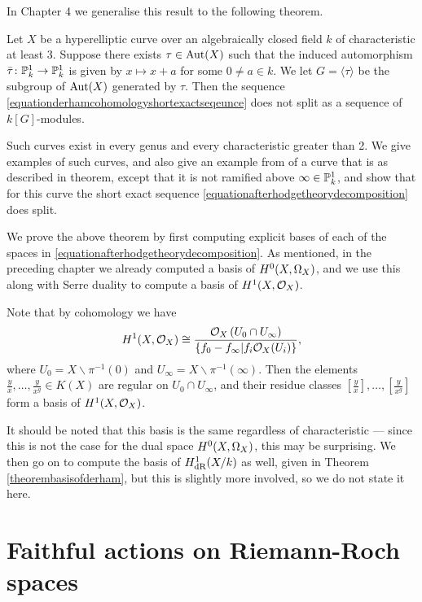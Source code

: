 In Chapter 4 we generalise this result to the following theorem.
    \begin{unnumthm}
    Let $X$ be a hyperelliptic curve over an algebraically closed field $k$ of characteristic at least 3.
    Suppose there exists $\tau \in \operatorname{Aut}(X)$ such that the induced automorphism $\bar \tau \colon \mathbb P_k^1 \rightarrow \mathbb P_k^1$ is given by $x \mapsto x+a$ for some $0 \neq a \in k$.
    We let $G = \langle \tau \rangle$ be the subgroup of $\operatorname{Aut}(X)$ generated by $\tau$.
    Then the sequence \eqref{equationderhamcohomologyshortexactseqeunce} does not split as a sequence of $k[G]$-modules.
    \end{unnumthm}
Such curves exist in every genus and every characteristic greater than 2.
We give examples of such curves, and also give an example from \cite{automorphismshyperellipticmodular} of a curve that is as described in theorem, except that it is not ramified above $\infty \in {\mathbb P}_k^1$, and show that for this curve the short exact sequence \eqref{equationafterhodgetheorydecomposition} does split.

We prove the above theorem by first computing explicit bases of each of the spaces in \eqref{equationafterhodgetheorydecomposition}.
As mentioned, in the preceding chapter we already computed a basis of ${H^0(X,\Omega_X)}$, and we use this along with Serre duality to compute a basis of $H^1(X,\mathcal{O}_X)$.
    \begin{unnumthm}
    Note that by \cech cohomology we have
        \[
        H^1(X,\mathcal{O}_X) \cong \frac{{\cal O}_X\left(U_0 \cap U_\infty\right)}{\{ f_0 - f_\infty | f_i {\cal O}_X(U_i)\}},
        \]
    where $U_0 = X \backslash \pi^{-1}(0)$ and $U_\infty = X \backslash \pi^{-1}(\infty)$.
    Then the elements $\frac{y}{x}, \ldots, \frac{y}{x^g} \in K(X)$ are regular on $U_0 \cap U_\infty$, and their residue classes $\left [ \frac{y}{x} \right ],  \ldots, \left [ \frac{y}{x^g} \right]$ form a basis of $H^1(X,\mathcal{O}_X)$.
    \end{unnumthm}
 It should be noted that this basis is the same regardless of characteristic --- since this is not the case for the dual space ${H^0(X,\Omega_X)}$, this may be surprising.
 We then go on to compute the basis of $H_{\text {dR}}^1(X/k)$ as well, given in Theorem \ref{theorembasisofderham}, but this is slightly more involved, so we do not state it here.


 \section{Faithful actions on Riemann-Roch spaces}

